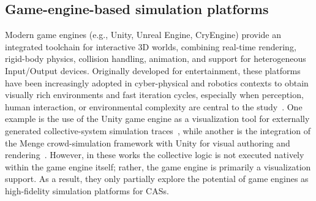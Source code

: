 %
\subsection{Game-engine-based simulation platforms}\label{sec:game-engines}

Modern game engines (e.g., Unity, Unreal Engine, CryEngine) provide an integrated toolchain for
interactive 3D worlds, combining real-time rendering, rigid-body physics, collision handling,
animation, and support for heterogeneous Input/Output devices.
%
Originally developed for entertainment, these platforms have been increasingly adopted in
cyber-physical and robotics contexts to obtain visually rich environments and fast iteration
cycles, especially when perception, human interaction, or environmental complexity are central
to the study~\cite{Coronado2023XRGameEngines}.
%
One example is the use of the Unity game engine as a visualization tool for
externally generated collective-system simulation traces~\cite{DelGiudice2024SequitSibilla},
while another is the integration of the Menge crowd-simulation framework with Unity for visual authoring and rendering~\cite{CrowdSimulationInUnity}.
%
However,
in these works the collective logic is not executed natively within the game engine itself;
rather,
the game engine is primarily a visualization support.
%
As a result, they only partially explore the potential of game engines as high-fidelity simulation
platforms for \acp{CAS}.

